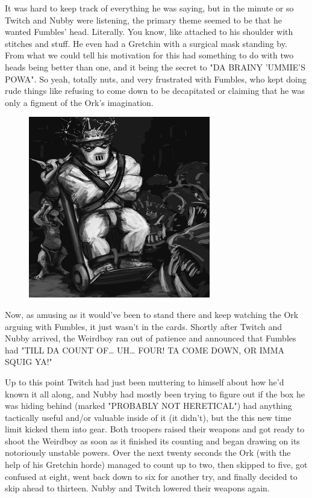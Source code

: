 It was hard to keep track of everything he was saying, but in the minute or so Twitch and Nubby were listening, the primary theme seemed to be that he wanted Fumbles' head. 
Literally. 
You know, like attached to his shoulder with stitches and stuff. 
He even had a Gretchin with a surgical mask standing by. 
From what we could tell his motivation for this had something to do with two heads being better than one, and it being the secret to "DA BRAINY 'UMMIE'S POWA". 
So yeah, totally nuts, and very frustrated with Fumbles, who kept doing rude things like refusing to come down to be decapitated or claiming that he was only a figment of the Ork's imagination.

\begin{figure}
	\begin{center}
		\includegraphics[width=\figwidth]{pics/16/31.png}
	\end{center}
\end{figure}
Now, as amusing as it would've been to stand there and keep watching the Ork arguing with Fumbles, it just wasn't in the cards. 
Shortly after Twitch and Nubby arrived, the Weirdboy ran out of patience and announced that Fumbles had "TILL DA COUNT OF… UH… FOUR! 
TA COME DOWN, OR IMMA SQUIG YA!"

Up to this point Twitch had just been muttering to himself about how he'd known it all along, and Nubby had mostly been trying to figure out if the box he was hiding behind (marked "PROBABLY NOT HERETICAL") had anything tactically useful and/or valuable inside of it (it didn't), but the this new time limit kicked them into gear. 
Both troopers raised their weapons and got ready to shoot the Weirdboy as soon as it finished its counting and began drawing on its notoriously unstable powers. 
Over the next twenty seconds the Ork (with the help of his Gretchin horde) managed to count up to two, then skipped to five, got confused at eight, went back down to six for another try, and finally decided to skip ahead to thirteen. 
Nubby and Twitch lowered their weapons again.


